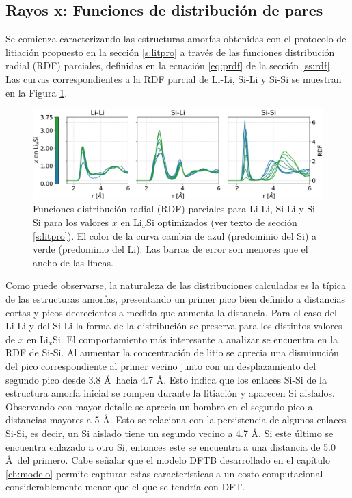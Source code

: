 \subsection{Rayos x: Funciones de distribución de pares}

Se comienza caracterizando las estructuras amorfas obtenidas con el protocolo 
de litiación propuesto en la sección \ref{s:litpro} a través de las funciones 
distribución radial (RDF) parciales, definidas en la ecuación \ref{eq:prdf}
de la sección \ref{ss:rdf}. Las curvas correspondientes a la RDF parcial de 
Li-Li, Si-Li y Si-Si se muestran en la Figura \ref{fig:prdfs}. 
\begin{figure}[h!]
    \centering
    \includegraphics[width=\textwidth]{Silicio/prediccion/resultados/xray/prdfs.png}
    \caption{Funciones distribución radial (RDF) parciales para Li-Li, Si-Li y Si-Si para los valores $x$ en 
    Li$_x$Si optimizados (ver texto de sección \ref{s:litpro}). El color de la curva cambia de azul (predominio del Si)
    a verde (predominio del Li). Las barras de error son menores que el ancho de 
    las líneas.}
    \label{fig:prdfs}
\end{figure}
Como puede observarse,
la naturaleza de las distribuciones calculadas es la típica de las estructuras
amorfas, presentando un primer pico bien definido a distancias cortas y picos 
decrecientes a medida que aumenta la distancia. Para el caso del Li-Li y del Si-Li
la forma de la distribución se preserva para los distintos valores de $x$ en 
Li$_x$Si. El comportamiento más interesante a analizar se encuentra en la RDF de 
Si-Si. Al aumentar la concentración de litio se aprecia una disminución del pico
correspondiente al primer vecino junto con un desplazamiento del segundo pico 
desde 3.8 \AA\ hacia 4.7 \AA. Esto indica que los enlaces Si-Si de la estructura 
amorfa inicial se rompen durante la litiación y aparecen Si aislados. Observando
con mayor detalle se aprecia un hombro en el segundo pico a distancias mayores 
a 5 \AA. Esto se relaciona con la persistencia de algunos enlaces Si-Si, es decir,
un Si aislado tiene un segundo vecino a 4.7 \AA. Si este último se encuentra 
enlazado a otro Si, entonces este se encuentra a una distancia de 5.0 \AA\ del 
primero. Cabe señalar que el modelo DFTB desarrollado en el capítulo 
\ref{ch:modelo} permite capturar estas características a un costo computacional
considerablemente menor que el que se tendría con DFT.

